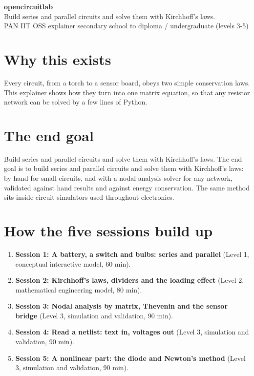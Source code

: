 \documentclass[11pt,a4paper]{article}
\begin{document}
\begin{center}{\LARGE\bfseries opencircuitlab}\\[0.4em]{\large Build series and parallel circuits and solve them with Kirchhoff's laws.}\\[0.2em]\small PAN IIT OSS explainer \textbullet{} secondary school to diploma / undergraduate (levels 3-5)\end{center}

\section*{Why this exists}
Every circuit, from a torch to a sensor board, obeys two simple conservation laws. This explainer shows how they turn into one matrix equation, so that any resistor network can be solved by a few lines of Python.

\section*{The end goal}
Build series and parallel circuits and solve them with Kirchhoff's laws. The end goal is to build series and parallel circuits and solve them with Kirchhoff's laws: by hand for small circuits, and with a nodal-analysis solver for any network, validated against hand results and against energy conservation. The same method sits inside circuit simulators used throughout electronics.

\section*{How the five sessions build up}
\begin{enumerate}[nosep]
\item \textbf{Session 1: A battery, a switch and bulbs: series and parallel} (Level 1, conceptual interactive model, 60 min).
\item \textbf{Session 2: Kirchhoff's laws, dividers and the loading effect} (Level 2, mathematical engineering model, 80 min).
\item \textbf{Session 3: Nodal analysis by matrix, Thevenin and the sensor bridge} (Level 3, simulation and validation, 90 min).
\item \textbf{Session 4: Read a netlist: text in, voltages out} (Level 3, simulation and validation, 90 min).
\item \textbf{Session 5: A nonlinear part: the diode and Newton's method} (Level 3, simulation and validation, 90 min).
\end{enumerate}
\end{document}
